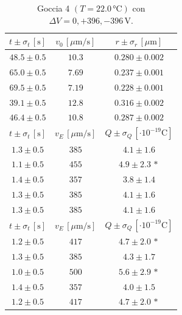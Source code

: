 \documentclass[]{article}
\begin{document}
    \begin{table}[H]
        \centering
        \begin{tabular}{||c|c|c||}
            \hline
            $t \pm \sigma_t \, \left[\text{s}\right]$ & $v_0 \, \left[\mu\text{m/s}\right]$ & $r \pm \sigma_r \, \left[\mu\text{m}\right]$ \\\hline
            \hline
            $48.5 \pm 0.5$ & $10.3$ & $0.280 \pm 0.002$ \\\hline
            $65.0 \pm 0.5$ & $7.69$ & $0.237 \pm 0.001$ \\\hline
            $69.5 \pm 0.5$ & $7.19$ & $0.228 \pm 0.001$ \\\hline
            $39.1 \pm 0.5$ & $12.8$ & $0.316 \pm 0.002$ \\\hline
            $46.4 \pm 0.5$ & $10.8$ & $0.287 \pm 0.002$ \\\hline
            \hline
            $t \pm \sigma_t \, \left[\text{s}\right]$ & $v_E \, \left[\mu\text{m/s}\right]$ & $Q \pm \sigma_Q \, \left[\cdot 10^{-19} \text{C}\right]$ \\\hline
            \hline
            $1.3 \pm 0.5$ & $385$ & $4.1 \pm 1.6$ \\\hline
            $1.1 \pm 0.5$ & $455$ & $4.9 \pm 2.3\,\ast$ \\\hline
            $1.4 \pm 0.5$ & $357$ & $3.8 \pm 1.4$ \\\hline
            $1.3 \pm 0.5$ & $385$ & $4.1 \pm 1.6$ \\\hline
            $1.3 \pm 0.5$ & $385$ & $4.1 \pm 1.6$ \\\hline
            \hline
            $t \pm \sigma_t \, \left[\text{s}\right]$ & $v_E \, \left[\mu\text{m/s}\right]$ & $Q \pm \sigma_Q \, \left[\cdot 10^{-19} \text{C}\right]$ \\\hline
            \hline
            $1.2 \pm 0.5$ & $417$ & $4.7 \pm 2.0\,\ast$ \\\hline
            $1.3 \pm 0.5$ & $385$ & $4.3 \pm 1.7$ \\\hline
            $1.0 \pm 0.5$ & $500$ & $5.6 \pm 2.9\,\ast$ \\\hline
            $1.4 \pm 0.5$ & $357$ & $4.0 \pm 1.5$ \\\hline
            $1.2 \pm 0.5$ & $417$ & $4.7 \pm 2.0\,\ast$ \\\hline
        \end{tabular}
        \caption{Goccia 4 $\left(T = 22.0\, \text{°C}\right)$ con $\Delta V = 0,+396,-396 \,\text{V}$.}
        \label{goccia-4}
    \end{table}
\end{document}
